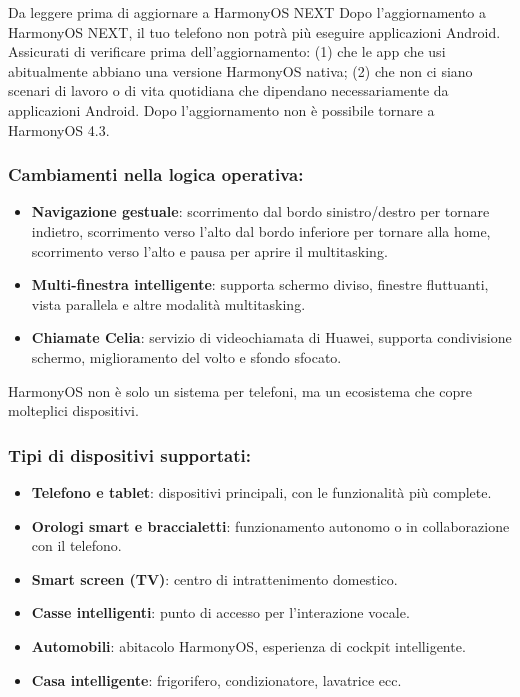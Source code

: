 \begin{tcbwarn}{Da leggere prima di aggiornare a HarmonyOS NEXT}
Dopo l'aggiornamento a HarmonyOS NEXT, il tuo telefono non potrà più eseguire applicazioni Android. Assicurati di verificare prima dell'aggiornamento: (1) che le app che usi abitualmente abbiano una versione HarmonyOS nativa; (2) che non ci siano scenari di lavoro o di vita quotidiana che dipendano necessariamente da applicazioni Android. Dopo l'aggiornamento non è possibile tornare a HarmonyOS 4.3.

\end{tcbwarn}

\subsubsection*{Cambiamenti nella logica operativa:}

\begin{itemize}
  \item \textbf{Navigazione gestuale}: scorrimento dal bordo sinistro/destro per tornare indietro, scorrimento verso l'alto dal bordo inferiore per tornare alla home, scorrimento verso l'alto e pausa per aprire il multitasking.
  \item \textbf{Multi-finestra intelligente}: supporta schermo diviso, finestre fluttuanti, vista parallela e altre modalità multitasking.
  \item \textbf{Chiamate Celia}: servizio di videochiamata di Huawei, supporta condivisione schermo, miglioramento del volto e sfondo sfocato.
\end{itemize}


HarmonyOS non è solo un sistema per telefoni, ma un ecosistema che copre molteplici dispositivi.

\subsubsection*{Tipi di dispositivi supportati:}

\begin{itemize}
  \item \textbf{Telefono e tablet}: dispositivi principali, con le funzionalità più complete.
  \item \textbf{Orologi smart e braccialetti}: funzionamento autonomo o in collaborazione con il telefono.
  \item \textbf{Smart screen (TV)}: centro di intrattenimento domestico.
  \item \textbf{Casse intelligenti}: punto di accesso per l'interazione vocale.
  \item \textbf{Automobili}: abitacolo HarmonyOS, esperienza di cockpit intelligente.
  \item \textbf{Casa intelligente}: frigorifero, condizionatore, lavatrice ecc.
\end{itemize}

